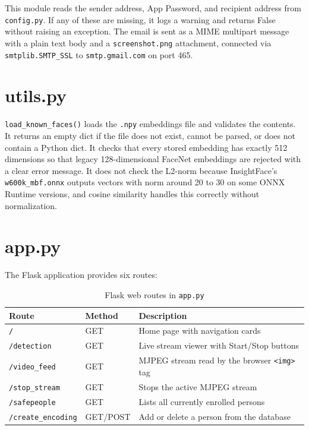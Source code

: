 \documentclass[12pt,a4paper]{report}
\begin{document}
This module reads the sender address, App Password, and recipient address from \texttt{config.py}. If any of these are missing, it logs a warning and returns False without raising an exception. The email is sent as a MIME multipart message with a plain text body and a \texttt{screenshot.png} attachment, connected via \texttt{smtplib.SMTP\_SSL} to \texttt{smtp.gmail.com} on port 465.

\section{utils.py}

\texttt{load\_known\_faces()} loads the \texttt{.npy} embeddings file and validates the contents. It returns an empty dict if the file does not exist, cannot be parsed, or does not contain a Python dict. It checks that every stored embedding has exactly 512 dimensions so that legacy 128-dimensional FaceNet embeddings are rejected with a clear error message. It does not check the L2-norm because InsightFace's \texttt{w600k\_mbf.onnx} outputs vectors with norm around 20 to 30 on some ONNX Runtime versions, and cosine similarity handles this correctly without normalization.

\section{app.py}

The Flask application provides six routes:

\begin{table}[htbp]
\centering
\begin{tabular}{|l|l|p{7cm}|}
\hline
\textbf{Route} & \textbf{Method} & \textbf{Description} \\
\hline
\texttt{/}                  & GET      & Home page with navigation cards \\
\texttt{/detection}         & GET      & Live stream viewer with Start/Stop buttons \\
\texttt{/video\_feed}       & GET      & MJPEG stream read by the browser \texttt{<img>} tag \\
\texttt{/stop\_stream}      & GET      & Stops the active MJPEG stream \\
\texttt{/safepeople}        & GET      & Lists all currently enrolled persons \\
\texttt{/create\_encoding}  & GET/POST & Add or delete a person from the database \\
\hline
\end{tabular}
\caption{Flask web routes in \texttt{app.py}}
\label{tab:flask_routes}
\end{table}
\end{document}
